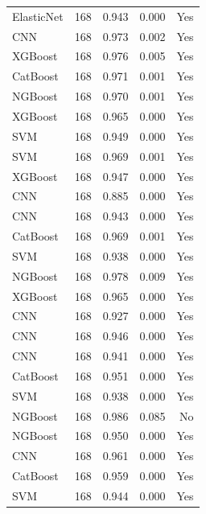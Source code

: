 \begin{table}
\begin{tabular}{lrrrr}
ElasticNet & 168 &        0.943 &     0.000 &                Yes \\
       CNN & 168 &        0.973 &     0.002 &                Yes \\
   XGBoost & 168 &        0.976 &     0.005 &                Yes \\
  CatBoost & 168 &        0.971 &     0.001 &                Yes \\
   NGBoost & 168 &        0.970 &     0.001 &                Yes \\
   XGBoost & 168 &        0.965 &     0.000 &                Yes \\
       SVM & 168 &        0.949 &     0.000 &                Yes \\
       SVM & 168 &        0.969 &     0.001 &                Yes \\
   XGBoost & 168 &        0.947 &     0.000 &                Yes \\
       CNN & 168 &        0.885 &     0.000 &                Yes \\
       CNN & 168 &        0.943 &     0.000 &                Yes \\
  CatBoost & 168 &        0.969 &     0.001 &                Yes \\
       SVM & 168 &        0.938 &     0.000 &                Yes \\
   NGBoost & 168 &        0.978 &     0.009 &                Yes \\
   XGBoost & 168 &        0.965 &     0.000 &                Yes \\
       CNN & 168 &        0.927 &     0.000 &                Yes \\
       CNN & 168 &        0.946 &     0.000 &                Yes \\
       CNN & 168 &        0.941 &     0.000 &                Yes \\
  CatBoost & 168 &        0.951 &     0.000 &                Yes \\
       SVM & 168 &        0.938 &     0.000 &                Yes \\
   NGBoost & 168 &        0.986 &     0.085 &                 No \\
   NGBoost & 168 &        0.950 &     0.000 &                Yes \\
       CNN & 168 &        0.961 &     0.000 &                Yes \\
  CatBoost & 168 &        0.959 &     0.000 &                Yes \\
       SVM & 168 &        0.944 &     0.000 &                Yes \\

\end{tabular}
\end{table}
